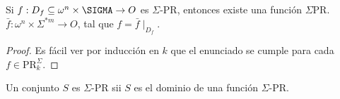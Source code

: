   \begin{lemma}
    \par Si $f: D_{f} \subseteq \omega^{n} \times \SIGMA \rightarrow O$ es $\Sigma$-PR, entonces existe una función
    $\Sigma$PR. $\bar{f}: \omega^{n} \times \Sigma^{\ast m} \rightarrow O$, tal que $f = \bar{f} \mid_{D_{f}}$.
  \end{lemma}
  \begin{proof}
    \par Es fácil ver por inducción en $k$ que el enunciado se cumple para cada $f \in \mathrm{PR}_{k}^{\Sigma}$.
  \end{proof}

  \begin{proposition}
    \par Un conjunto $S$ es $\Sigma$-PR sii $S$ es el dominio de una función $\Sigma$-PR.
  \end{proposition}
